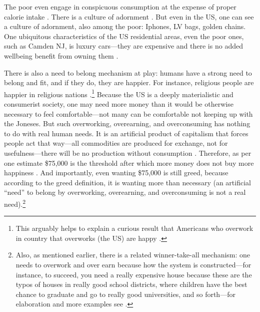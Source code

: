 \documentclass[10pt, letterpaper]{article}
\begin{document}
\begin{spacing}{1.8}
{The poor even engage in conspicuous consumption at the expense of proper calorie intake \citep{bellet18}. There is a culture of adornment \citep{cordwell2011fabrics,mascia1992tattoo}. But even in the US, one can see a culture of adornment, also among the poor: Iphones, LV bags, golden chains. %
 One ubiquitous characteristics of the US residential areas, even the poor ones,
 such as Camden NJ, is luxury cars---they are expensive and there is no added    
 wellbeing benefit from owning them \citep{aok_ls_car15}.
}

There is also a need to belong mechanism at play: humans have a strong need to
belong and fit, and if they do, they are happier. For instance, religious people are happier in religious nations
\citep{aokrel}.\footnote{This arguably helps to explain a curious result that
  Americans who overwork in country that overworks (the US) are happy \citep{aokditella}.}
Because the US is a deeply materialistic and consumerist society, one may need more money than it would be otherwise necessary to feel comfortable---not
many can be comfortable not keeping up with the Joneses. But such overworking, overearning, and overconsuming has nothing to do with real human needs. It is an artificial
product of capitalism that forces people act that way---all commodities are
produced for exchange, not for usefulness---there will be no production without
consumption \citep{marx1844-human-requirements}. Therefore, as per one estimate
\$75,000 is the threshold after which more money does not buy more happiness
\citep{kahneman10}. And importantly, even wanting \$75,000 is still greed,
because according to the greed definition, it is wanting more than necessary (an
artificial ``need'' to belong by overworking, overearning, and overconsuming is not a real need).\footnote{Also, as mentioned earlier, there is a related winner-take-all
  mechanism: one needs to overwork and over earn because how the system is constructed---for instance, to succeed, you need a really expensive house
  because these are the typos of houses in really good school districts, where children have the best chance to graduate and go to really good universities, and
  so forth---for elaboration and more examples see \citet{frank12}.}


\end{spacing}
\end{document}

